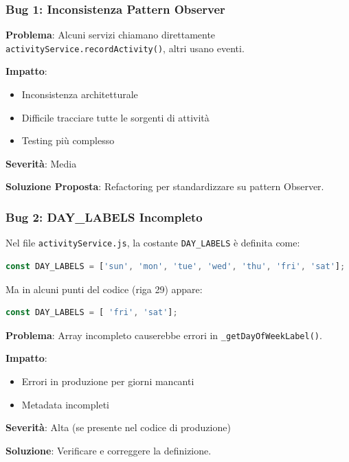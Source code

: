 \documentclass[11pt,a4paper]{article}
\begin{document}
\subsubsection{Bug 1: Inconsistenza Pattern Observer}

\textbf{Problema}: Alcuni servizi chiamano direttamente \texttt{activityService.recordActivity()}, altri usano eventi.

\textbf{Impatto}: 
\begin{itemize}
    \item Inconsistenza architetturale
    \item Difficile tracciare tutte le sorgenti di attività
    \item Testing più complesso
\end{itemize}

\textbf{Severità}: Media

\textbf{Soluzione Proposta}: Refactoring per standardizzare su pattern Observer.

\subsubsection{Bug 2: DAY\_LABELS Incompleto}

Nel file \texttt{activityService.js}, la costante \texttt{DAY\_LABELS} è definita come:

\begin{lstlisting}[language=JavaScript]
const DAY_LABELS = ['sun', 'mon', 'tue', 'wed', 'thu', 'fri', 'sat'];
\end{lstlisting}

Ma in alcuni punti del codice (riga 29) appare:

\begin{lstlisting}[language=JavaScript]
const DAY_LABELS = [ 'fri', 'sat'];
\end{lstlisting}

\textbf{Problema}: Array incompleto causerebbe errori in \texttt{\_getDayOfWeekLabel()}.

\textbf{Impatto}: 
\begin{itemize}
    \item Errori in produzione per giorni mancanti
    \item Metadata incompleti
\end{itemize}

\textbf{Severità}: Alta (se presente nel codice di produzione)

\textbf{Soluzione}: Verificare e correggere la definizione.
\end{document}
